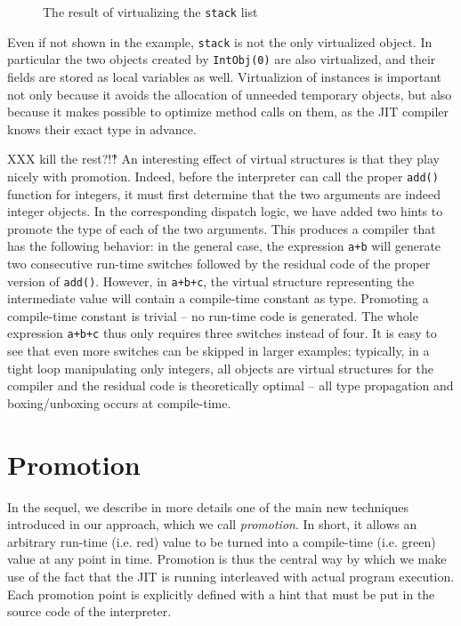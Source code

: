\begin{figure}[h]
\begin{center}

\caption{The result of virtualizing the \lstinline{stack} list}
\label{fig:tlc-main}
\end{center}
\end{figure}

Even if not shown in the example, \lstinline{stack} is not the only
virtualized object.  In particular the two objects created by
\lstinline{IntObj(0)} are also virtualized, and their fields are stored as
local variables as well.  Virtualizion of instances is important not only
because it avoids the allocation of unneeded temporary objects, but also
because it makes possible to optimize method calls on them, as the JIT
compiler knows their exact type in advance.

XXX kill the rest?!‽
An interesting effect of virtual structures is that they play nicely with
promotion.  Indeed, before the interpreter can call the proper \texttt{add()}
function for integers, it must first determine that the two arguments
are indeed integer objects.  In the corresponding dispatch logic, we
have added two hints to promote the type of each of the two arguments.
This produces a compiler that has the following behavior: in the general
case, the expression \texttt{a+b} will generate two consecutive run-time
switches followed by the residual code of the proper version of
\texttt{add()}.  However, in \texttt{a+b+c}, the virtual structure representing
the intermediate value will contain a compile-time constant as type.
Promoting a compile-time constant is trivial – no run-time code is
generated.  The whole expression \texttt{a+b+c} thus only requires three
switches instead of four.  It is easy to see that even more switches can
be skipped in larger examples; typically, in a tight loop manipulating
only integers, all objects are virtual structures for the compiler and
the residual code is theoretically optimal – all type propagation and
boxing/unboxing occurs at compile-time.


\section{Promotion}
\label{sec:promotion}

In the sequel, we describe in more details one of the main new
techniques introduced in our approach, which we call \emph{promotion}.  In
short, it allows an arbitrary run-time (i.e. red) value to be turned into a
compile-time (i.e. green) value at any point in time.  Promotion is thus the central way by
which we make use of the fact that the JIT is running interleaved with actual
program execution. Each promotion point is explicitly defined with a hint that
must be put in the source code of the interpreter.

